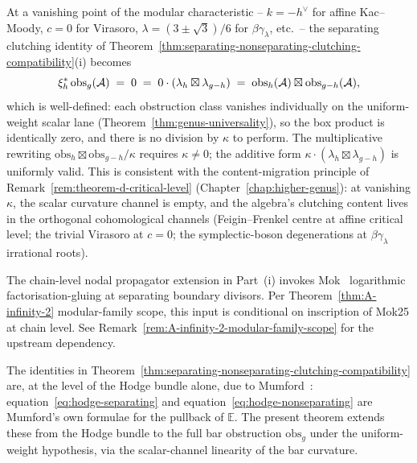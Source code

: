 \begin{remark}
\label{rem:clutching-vanishing-kappa-bilinear}
At a vanishing point of the modular characteristic --
$k = -h^\vee$ for affine Kac--Moody, $c = 0$ for Virasoro,
$\lambda = (3 \pm \sqrt{3})/6$ for $\beta\gamma_\lambda$, etc.\ --
the separating clutching identity of
Theorem~\ref{thm:separating-nonseparating-clutching-compatibility}(i)
becomes
\[
\xi_h^*\,\mathrm{obs}_g(\mathcal{A})
\;=\; 0
\;=\; 0\cdot(\lambda_h \boxtimes \lambda_{g-h})
\;=\; \mathrm{obs}_h(\mathcal{A}) \boxtimes \mathrm{obs}_{g-h}(\mathcal{A}),
\]
which is well-defined: each obstruction class vanishes individually
on the uniform-weight scalar lane (Theorem~\ref{thm:genus-universality}),
so the box product is identically zero, and there is no division by
$\kappa$ to perform. The multiplicative rewriting
$\mathrm{obs}_h \boxtimes \mathrm{obs}_{g-h} / \kappa$ requires
$\kappa \neq 0$; the additive form $\kappa \cdot (\lambda_h \boxtimes
\lambda_{g-h})$ is uniformly valid. This is consistent with the
content-migration principle of
Remark~\ref{rem:theorem-d-critical-level} (Chapter~\ref{chap:higher-genus}):
at vanishing $\kappa$, the scalar curvature channel is empty, and
the algebra's clutching content lives in the orthogonal cohomological
channels (Feigin--Frenkel centre at affine critical level; the
trivial Virasoro at $c = 0$; the symplectic-boson degenerations at
$\beta\gamma_\lambda$ irrational roots).
\end{remark}

\begin{remark}[Scope]
\label{rem:clutching-compatibility-mok25-scope}
The chain-level nodal propagator extension in Part~(i) invokes
Mok~\cite{Mok25} logarithmic factorisation-gluing at separating
boundary divisors. Per Theorem~\ref{thm:A-infinity-2}
modular-family scope, this input is conditional on inscription of
Mok25 at chain level. See
Remark~\ref{rem:A-infinity-2-modular-family-scope} for the upstream
dependency.
\end{remark}

\begin{remark}
\label{rem:mumford-clutching}
The identities in
Theorem~\ref{thm:separating-nonseparating-clutching-compatibility}
are, at the level of the Hodge bundle alone, due to
Mumford~\cite{Mumford83}: equation~\eqref{eq:hodge-separating} and
equation~\eqref{eq:hodge-nonseparating} are Mumford's own formulae
for the pullback of $\mathbb{E}$. The present theorem extends these
from the Hodge bundle to the full bar obstruction $\mathrm{obs}_g$
under the uniform-weight hypothesis, via the scalar-channel
linearity of the bar curvature.
\end{remark}

